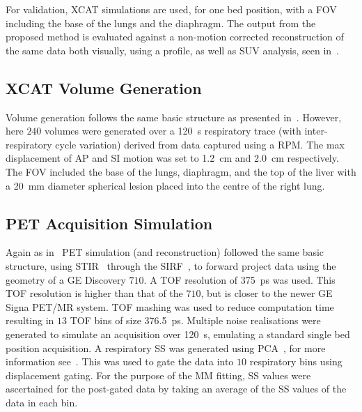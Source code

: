             For validation, \gls{XCAT} simulations are used, for one bed position, with a \gls{FOV} including the base of the lungs and the diaphragm. The output from the proposed method is evaluated against a non-motion corrected reconstruction of the same data both visually, using a profile, as well as \gls{SUV} analysis, seen in~.
            
            \subsection{XCAT Volume Generation} \label{sec:pet_ct_respiratory_motion_correction_with_a_single_attenuation_map_using_nac_derived_deformation_fields_methods_xcat_volume_generation}
                Volume generation follows the same basic structure as presented in~. However, here $240$ volumes were generated over a \SI{120}{\second} respiratory trace (with inter-respiratory cycle variation) derived from data captured using a \gls{RPM}. The max displacement of \gls{AP} and \gls{SI} motion was set to \SI{1.2}{\centi\metre} and \SI{2.0}{\centi\metre} respectively. The \gls{FOV} included the base of the lungs, diaphragm, and the top of the liver with a \SI{20}{\milli\metre} diameter spherical lesion placed into the centre of the right lung.
    
            \subsection{PET Acquisition Simulation} \label{sec:pet_ct_respiratory_motion_correction_with_a_single_attenuation_map_using_nac_derived_deformation_fields_methods_pet_acquisition_simulation}
                Again as in~ \gls{PET} simulation (and reconstruction) followed the same basic structure, using \gls{STIR}~\parencite{Thielemans2012, Nikos2019, Wadhwa2021PETLibrary} through the \gls{SIRF}~\parencite{Ovtchinnikov2017}, to forward project data using the geometry of a \gls{GE} Discovery $710$.  A \gls{TOF} resolution of \SI{375}{\pico\second} was used. This \gls{TOF} resolution is higher than that of the $710$, but is closer to the newer \gls{GE} Signa \gls{PET}/\gls{MR} system. \gls{TOF} mashing was used to reduce computation time resulting in $13$ \gls{TOF} bins of size \SI{376.5}{\pico\second}. Multiple noise realisations were generated to simulate an acquisition over \SI{120}{\second}, emulating a standard single bed position acquisition. A respiratory \gls{SS} was generated using \gls{PCA}~\parencite{Thielemans2011}, for more information see~. This was used to gate the data into $10$ respiratory bins using displacement gating. For the purpose of the \gls{MM} fitting, \gls{SS} values were ascertained for the post-gated data by taking an average of the \gls{SS} values of the data in each bin.
            
